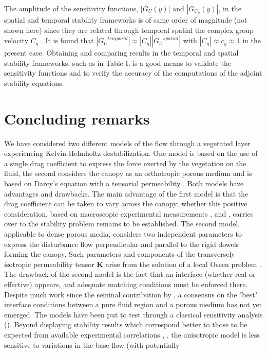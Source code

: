 The amplitude of the sensitivity functions, $|G_{U} ( y)|$ and $|G_{C_d} (y)|$, in the spatial and temporal
stability frameworks is of same order of magnitude (not shown here) since they are related through
temporal spatial the complex group velocity $C_g$ . It is found that $|{G_U}^{temporal}| \approx |C_g ||{G_U}^{spatial}|$ with $|C_g | \approx c_g \approx 1$ in the
present case.
Obtaining and comparing results in the temporal and spatial stability frameworks, such as in
Table I, is a good means to validate the sensitivity functions and to verify the accuracy of the
computations of the adjoint stability equations.


\section{Concluding remarks}
We have considered two different models of the flow through a vegetated layer experiencing Kelvin-Helmholtz destabilization. One model is based on the use of a single drag coefficient to express the force exerted by the vegetation on the fluid, the second considers the canopy as an orthotropic porous medium and is based on Darcy’s equation with a tensorial permeability \citet{zampogna2016fluid}. 
Both models have advantages and drawbacks. The main advantage of the first model is that the
drag coefficient can be taken to vary across the canopy; whether this positive consideration, based
on macroscopic experimental measurements \citet{ghisalberti2002mixing}, \citet{ghisalberti2004limited} and \citet{ghisalberti2005mass},  carries over to the stability problem remains to be established. The second model, applicable to dense porous media, considers two independent parameters to express the disturbance flow perpendicular and parallel to the rigid dowels forming
the canopy. Such parameters and components of the transversely isotropic permeability tensor $\mathbf{K}$
arise from the solution of a local Oseen problem \citet{zampogna2016fluid}. The drawback of the second model is the
fact that an interface (whether real or effective) appears, and adequate matching conditions must
be enforced there. Despite much work since the seminal contribution by \citet{beaver}, a
consensus on the "best" interface conditions between a pure fluid region and a porous medium has
not yet emerged.
The models have been put to test through a classical sensitivity analysis (\citet{bottaro2003effect}). Beyond displaying stability results which correspond better to those to be expected from available experimental correlations \citet{raupach1996coherent}, \citet{zampogna2016instability}, the anisotropic model is less sensitive to variations in the base flow (with potentially
